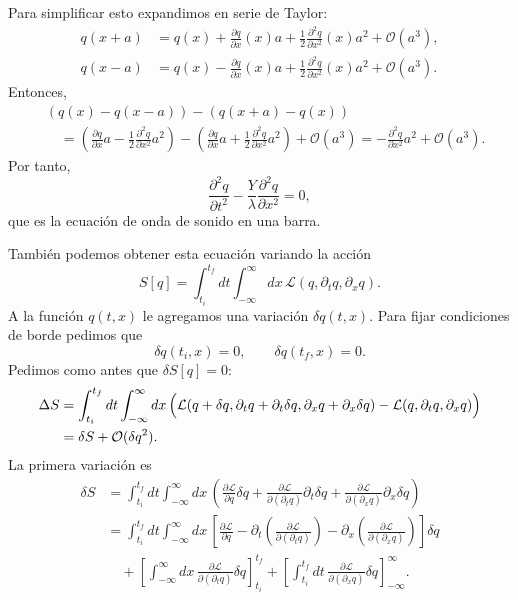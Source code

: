 \documentclass[11pt,a4paper]{article}
\begin{document}
Para simplificar esto expandimos en serie de Taylor:
\begin{align*}
  q(x+a)
  &=q(x)+\frac{\partial q}{\partial x}(x)a
    +\frac12\frac{\partial^2q}{\partial x^2}(x)a^2
    +\mathcal O(a^3),\\
  q(x-a)
  &=q(x)-\frac{\partial q}{\partial x}(x)a
    +\frac12\frac{\partial^2q}{\partial x^2}(x)a^2
    +\mathcal O(a^3).
\end{align*}
Entonces,
\begin{align*}
  &(q(x)-q(x-a))-(q(x+a)-q(x))\\
  &\quad=
  \left(
    \frac{\partial q}{\partial x}a
    -\frac12\frac{\partial^2q}{\partial x^2}a^2
  \right)
  -\left(
    \frac{\partial q}{\partial x}a
    +\frac12\frac{\partial^2q}{\partial x^2}a^2
  \right)
  +\mathcal O(a^3)
  =-\frac{\partial^2q}{\partial x^2}a^2+\mathcal O(a^3).
\end{align*}
Por tanto,
\[
  \frac{\partial^2q}{\partial t^2}
  -\frac{Y}{\lambda}\frac{\partial^2q}{\partial x^2}=0,
\]
que es la ecuación de onda de sonido en una barra.

También podemos obtener esta ecuación variando la acción
\[
  S[q]
  =\int_{t_i}^{t_f}dt\int_{-\infty}^{\infty}dx\,
  \mathcal L(q,\partial_tq,\partial_xq).
\]
A la función $q(t,x)$ le agregamos una variación $\delta q(t,x)$. Para fijar
condiciones de borde pedimos que
\[
  \delta q(t_i,x)=0,
  \qquad
  \delta q(t_f,x)=0.
\]
Pedimos como antes que $\delta S[q]=0$:
\begin{align*}
  \Delta S
  &=\int_{t_i}^{t_f}dt\int_{-\infty}^{\infty}dx\,
    \Bigl(
      \mathcal L(q+\delta q,
      \partial_tq+\partial_t\delta q,
      \partial_xq+\partial_x\delta q)
      -\mathcal L(q,\partial_tq,\partial_xq)
    \Bigr)\\
  &=\delta S+\mathcal O(\delta q^2).
\end{align*}
La primera variación es
\begin{align*}
  \delta S
  &=\int_{t_i}^{t_f}dt\int_{-\infty}^{\infty}dx\,
    \left(
      \frac{\partial\mathcal L}{\partial q}\delta q
      +\frac{\partial\mathcal L}{\partial(\partial_tq)}
        \partial_t\delta q
      +\frac{\partial\mathcal L}{\partial(\partial_xq)}
        \partial_x\delta q
    \right)\\
  &=\int_{t_i}^{t_f}dt\int_{-\infty}^{\infty}dx\,
    \left[
      \frac{\partial\mathcal L}{\partial q}
      -\partial_t\left(
        \frac{\partial\mathcal L}{\partial(\partial_tq)}
      \right)
      -\partial_x\left(
        \frac{\partial\mathcal L}{\partial(\partial_xq)}
      \right)
    \right]\delta q\\
  &\quad+
    \left[
      \int_{-\infty}^{\infty}dx\,
      \frac{\partial\mathcal L}{\partial(\partial_tq)}\delta q
    \right]_{t_i}^{t_f}
    +\left[
      \int_{t_i}^{t_f}dt\,
      \frac{\partial\mathcal L}{\partial(\partial_xq)}\delta q
    \right]_{-\infty}^{\infty}.
\end{align*}
\end{document}
